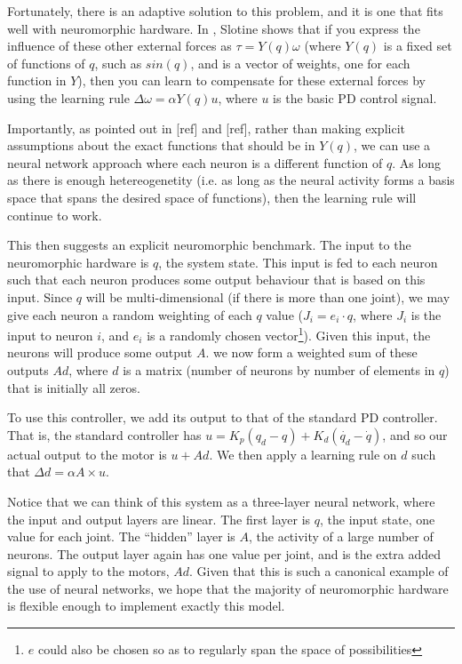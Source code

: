 \documentclass{frontiersSCNS} %
\begin{document}
Fortunately, there is an adaptive solution to this problem, and it is one that
fits well with neuromorphic hardware.  In \cite{Slotine1987}, Slotine shows that if you
express the influence of these other external forces as $\tau=Y(q) \omega$
(where $Y(q)$ is a fixed set of functions of $q$, such as $sin(q)$, and \omega
is a vector of weights, one for each function in $Y$), then you can learn
to compensate for these external forces by using the learning rule $\Delta \omega = \alpha Y(q) u$,
where $u$ is the basic PD control signal.

Importantly, as pointed out in [ref] and [ref], rather than making explicit
assumptions about the exact functions that should be in $Y(q)$, we can use
a neural network approach where each neuron is a different function of $q$.  
As long as there is enough hetereogenetity (i.e. as long as the neural activity
forms a basis space that spans the desired space of functions), then the
learning rule will continue to work.  

This then suggests an explicit neuromorphic benchmark.  The input to the
neuromorphic hardware is $q$, the system state.  This input is fed to each
neuron such that each neuron produces some output behaviour that is based on
this input.  Since $q$ will be multi-dimensional (if there is more than one
joint), we may give each neuron a random weighting of each $q$ value ($J_i=e_i \cdot q$, 
where $J_i$ is the input to neuron $i$, and $e_i$ is a randomly chosen vector\footnote{$e$ could also be chosen so as to regularly span the space of possibilities}).  Given this input, the neurons will produce some output $A$.
we now form a weighted sum of these outputs $Ad$, where $d$ is a matrix (number of neurons by number of elements in $q$)
that is initially all zeros.

To use this controller, we add its output to that of the standard PD controller.
That is, the standard controller has $u=K_p(q_d - q) + K_d(\dot{q_d} - \dot{q})$,
and so our actual output to the motor is $u + Ad$.  We then apply a learning
rule on $d$ such that $\Delta d = \alpha A \times u$.

Notice that we can think of this system as a three-layer neural
network, where the input and output layers are linear.  The first layer is $q$, the input state, one value for each joint.  The ``hidden'' layer
is $A$, the activity of a large number of neurons.  The output layer again has
one value per joint, and is the extra added signal to apply to the motors, $Ad$.
Given that this is such a canonical example of the use of neural networks, we
hope that the majority of neuromorphic hardware is flexible enough to implement
exactly this model.
\end{document}
